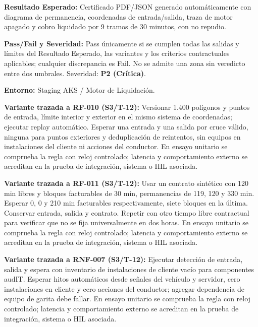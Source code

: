 \par\noindent\textbf{Resultado Esperado:} Certificado PDF/JSON generado automáticamente con diagrama de permanencia, coordenadas de entrada/salida, traza de motor apagado y cobro liquidado por 9 tramos de 30 minutos, con no repudio.\par
\par\noindent\textbf{Pass/Fail y Severidad:} Pass únicamente si se cumplen todas las salidas y límites del Resultado Esperado, las variantes y los criterios contractuales aplicables; cualquier discrepancia es Fail. No se admite una zona sin veredicto entre dos umbrales. Severidad: \textbf{P2 (Crítica)}.\par
\par\noindent\textbf{Entorno:} Staging AKS / Motor de Liquidación.\par







\par\noindent\textbf{Variante trazada a RF-010 (S3/T-12):} Versionar 1.400 polígonos y puntos de entrada, límite interior y exterior en el mismo sistema de coordenadas; ejecutar replay automático. Esperar una entrada y una salida por cruce válido, ninguna para puntos exteriores y deduplicación de reintentos, sin equipos en instalaciones del cliente ni acciones del conductor. En ensayo unitario se comprueba la regla con reloj controlado; latencia y comportamiento externo se acreditan en la prueba de integración, sistema o HIL asociada.\par

\par\noindent\textbf{Variante trazada a RF-011 (S3/T-12):} Usar un contrato sintético con 120 min libres y bloques facturables de 30 min, permanencias de 119, 120 y 330 min. Esperar 0, 0 y 210 min facturables respectivamente, siete bloques en la última. Conservar entrada, salida y contrato. Repetir con otro tiempo libre contractual para verificar que no se fija universalmente en dos horas. En ensayo unitario se comprueba la regla con reloj controlado; latencia y comportamiento externo se acreditan en la prueba de integración, sistema o HIL asociada.\par

\par\noindent\textbf{Variante trazada a RNF-007 (S3/T-12):} Ejecutar detección de entrada, salida y espera con inventario de instalaciones de cliente vacío para componentes audIT. Esperar hitos automáticos desde señales del vehículo y servidor, cero instalaciones en cliente y cero acciones del conductor; agregar dependencia de equipo de garita debe fallar. En ensayo unitario se comprueba la regla con reloj controlado; latencia y comportamiento externo se acreditan en la prueba de integración, sistema o HIL asociada.\par
